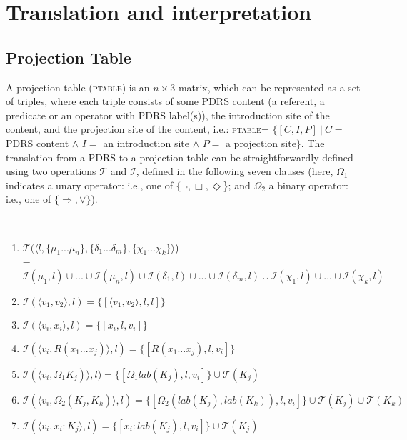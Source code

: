 \section{Translation and interpretation}\label{sec:translating}

\subsection{Projection Table}

A projection table (\textsc{ptable}) is an $n\times3$ matrix, which can be
represented as a set of triples, where each triple consists of some PDRS
content (a referent, a predicate or an operator with PDRS label(s)), the
introduction site of the content, and the projection site of the content,
i.e.: \textsc{ptable}= $\{[C,I,P]~|~C=$ PDRS content $\wedge$ $I=$ an
introduction site $\wedge$ $P=$ a projection site$\}$. The translation from
a PDRS to a projection table can be straightforwardly defined using two
operations $\mathcal{T}$ and $\mathcal{I}$, defined in the following seven
clauses (here, $\Omega_1$ indicates a unary operator: i.e., one of $\{\neg, \Box,
\Diamond$\}; and $\Omega_2$ a binary operator: i.e., one of $\{\Rightarrow,
\vee\}$).

\begin{definition}~\\\vspace{-12pt}
\begin{enumerate}
  \item $\mathcal{T}(\langle l,\{\mu_1...\mu_n\},
    \{\delta_1...\delta_m\}, \{\chi_1...\chi_k\}\rangle$)\\
    = $\mathcal{I}(\mu_1,l)\cup...\cup \mathcal{I}(\mu_n, l)\cup
      \mathcal{I}(\delta_1,l)\cup...\cup \mathcal{I}(\delta_m,l)\cup
      \mathcal{I}(\chi_1,l)\cup...\cup \mathcal{I}(\chi_k,l)$
  \item $\mathcal{I}(\langle v_1, v_2 \rangle,l)
    = \{[\langle v_1, v_2 \rangle,l,l]\}$
  \item $\mathcal{I}(\langle v_i, x_i \rangle,l)
    = \{[x_i,l,v_i]\}$
  \item $\mathcal{I}(\langle v_i, R(x_1...x_j) \rangle,l)
    = \{[R(x_1...x_j),l,v_i]\}$
  \item $\mathcal{I}(\langle v_i, \Omega_1 K_j) \rangle,l)
    = \{[\Omega_1 lab(K_j),l,v_i]\} \cup \mathcal{T}(K_j)$
  \item $\mathcal{I}(\langle v_i,  \Omega_2(K_j, K_k) \rangle,l)
    = \{[\Omega_2(lab(K_j),lab(K_k)),l,v_i]\} \cup \mathcal{T}(K_j)
      \cup \mathcal{T}(K_k)$
  \item $\mathcal{I}(\langle v_i, x_i:K_j \rangle,l)
    = \{[x_i:lab(K_j),l,v_i]\} \cup \mathcal{T}(K_j)$
\end{enumerate}
\end{definition}

